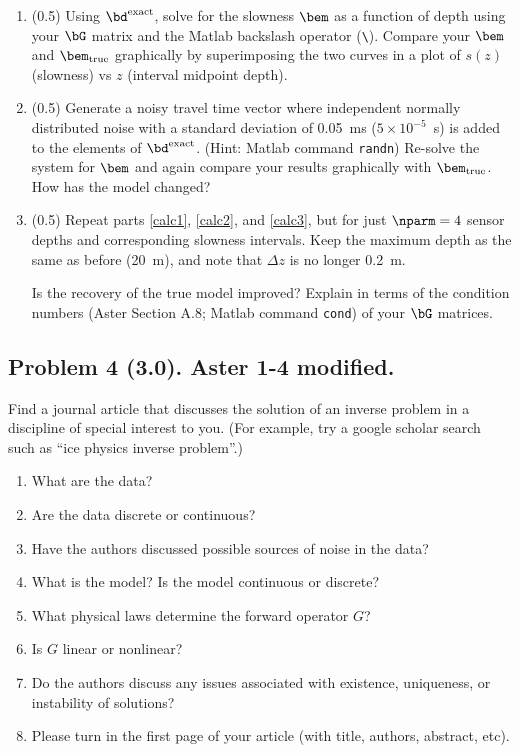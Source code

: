 \documentclass[11pt,titlepage,fleqn]{article}
\begin{document}
\begin{enumerate}
\label{calc1}


\item (0.5) Using $\bd^{\rm exact}$, solve for the slowness $\bem$ as a function of depth using your $\bG$ matrix and the Matlab backslash operator (\verb+\+). Compare your $\bem$ and $\bem_{\rm true}$  graphically by superimposing the two curves in a plot of $s(z)$ (slowness) vs $z$ (interval midpoint depth).

\label{calc2}


\item (0.5) Generate a noisy travel time vector where independent normally distributed noise with a standard deviation of 0.05~ms ($5 \times 10^{-5}$~s) is added to the elements of $\bd^{\rm exact}$. (Hint: Matlab command \verb+randn+) Re-solve the system for $\bem$ and again compare your results graphically with $\bem_{\rm true}$. How has the model changed?


\label{calc3}


\item (0.5) Repeat parts \ref{calc1}, \ref{calc2}, and \ref{calc3}, but for just $\nparm=4$ sensor depths and corresponding slowness intervals. Keep the maximum depth as the same as before (20~m), and note that $\Delta z$ is no longer 0.2~m.

Is the recovery of the true model improved? Explain in terms of the condition numbers (Aster Section A.8; Matlab command \verb+cond+) of your $\bG$ matrices.

\end{enumerate}


\pagebreak
\subsection*{Problem 4 (3.0). Aster 1-4 modified.}

Find a journal article that discusses the solution of an inverse problem in a discipline of special interest to you. (For example, try a google scholar search such as ``ice physics inverse problem''.)
%
\begin{enumerate}
\item What are the data?
\item Are the data discrete or continuous?
\item Have the authors discussed possible sources of noise in the data?
\item What is the model? Is the model continuous or discrete?
\item What physical laws determine the forward operator $G$?
\item Is $G$ linear or nonlinear?
\item Do the authors discuss any issues associated with existence, uniqueness, or instability of solutions?
\item Please turn in the first page of your article (with title, authors, abstract, etc).
\end{enumerate}
\end{document}
